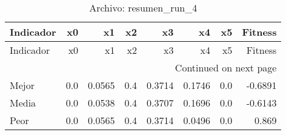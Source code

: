 \begin{longtable}{lrrrrrrr}
\caption{Archivo: resumen\_run\_4}\label{tab:resumen_run_4} \\
\toprule
Indicador & x0 & x1 & x2 & x3 & x4 & x5 & Fitness \\
\midrule
\endfirsthead
\toprule
Indicador & x0 & x1 & x2 & x3 & x4 & x5 & Fitness \\
\midrule
\endhead
\midrule
\multicolumn{8}{r}{Continued on next page} \\
\midrule
\endfoot
\bottomrule
\endlastfoot
Mejor & 0.0 & 0.0565 & 0.4 & 0.3714 & 0.1746 & 0.0 & -0.6891 \\
Media & 0.0 & 0.0538 & 0.4 & 0.3707 & 0.1696 & 0.0 & -0.6143 \\
Peor & 0.0 & 0.0565 & 0.4 & 0.3714 & 0.0496 & 0.0 & 0.869 \\
\end{longtable}